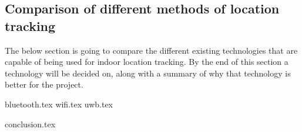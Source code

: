 \subsection{Comparison of different methods of location tracking}
The below section is going to compare the different existing technologies that are capable of being used for indoor location tracking. By the end of this section a technology will be decided on, along with a summary of why that technology is better for the project.

{bluetooth.tex}
{wifi.tex}
{uwb.tex}

{conclusion.tex}